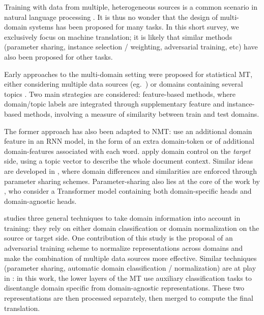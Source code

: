 \documentclass[11pt,a4paper]{article}
\begin{document}
Training with data from multiple, heterogeneous sources is a common scenario in natural language processing \cite{Dredze08online,Finkel09hierarchical}. It is thus no wonder that the design of multi-domain systems has been proposed for many tasks. In this short survey, we exclusively focus on machine translation; it is likely that similar methods (parameter sharing, instance selection / weighting, adversarial training, etc) have also been proposed for other tasks.

Early approaches to the multi-domain setting were proposed for statistical MT, either considering multiple data sources (eg.\ \cite{Banerjee10combining,Clark12onesystem,Sennrich13multidomain,Huck15mixeddomain}) or domains containing several topics \cite{Eidelman12topic,Hasler14dynamic-topic}. Two main strategies are considered: feature-based methods, where domain/topic labels are integrated through supplementary feature and instance-based methods, involving a measure of similarity between train and test domains. 

The former approach has also been adapted to NMT:  use an additional domain feature in an RNN model, in the form of an extra domain-token or of additional domain-features associated with each word. \citet{Chen16guided} apply domain control on the \emph{target} side, using a topic vector to describe the whole document context. Similar ideas are developed in \cite{Chu18multilingual,Pham19generic}, where domain differences and similarities are enforced through parameter sharing schemes. Parameter-sharing also lies at the core of the work by \citet{Jiang19multidomain}, who consider a Transformer model containing both domain-specific heads and domain-agnostic heads.

\citet{Britz17mixing} studies three general techniques to take domain information into account in training: they rely on either domain classification or domain normalization on the source or target side. One contribution of this study is the proposal of an adversarial training scheme to normalize representations across domains and make the combination of multiple data sources more effective. Similar techniques (parameter sharing, automatic domain classification / normalization) are at play in \cite{Zeng18multidomain}: in this work, the lower layers of the MT use auxiliary classification tasks to disentangle domain specific from domain-agnostic representations. These two representations are then processed separately, then merged to compute the final translation.
\end{document}
